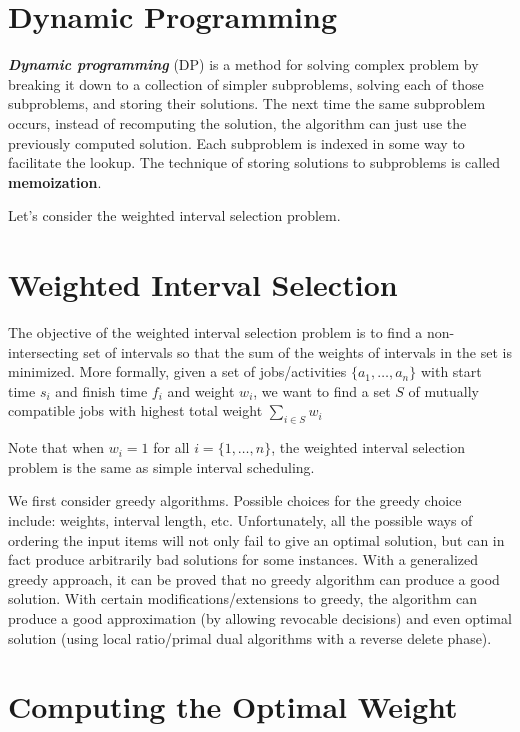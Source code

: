 \section{Dynamic Programming}  

\textit{\textbf{Dynamic programming}} (DP) is a method for solving complex problem by breaking it down to a collection of simpler subproblems, solving each of those subproblems, and storing their solutions. The next time the same subproblem occurs, instead of recomputing the solution, the algorithm can just use the previously computed solution. Each subproblem is indexed in some way to facilitate the lookup. The technique of storing solutions to subproblems is called \textbf{memoization}.

Let's consider the weighted interval selection problem.

\section{Weighted Interval Selection}

The objective of the weighted interval selection problem is to find a non-intersecting set of intervals so that the sum of the weights of intervals in the set is minimized. More formally, given a set of jobs/activities $\{a_1,\ldots,a_n\}$ with start time $s_i$ and finish time $f_i$ and weight $w_i$, we want to find a set $S$ of mutually compatible jobs with highest total weight $\sum_{i \in S} w_i$ 

Note that when $w_i = 1$ for all $i = \{1,\ldots,n\}$, the weighted interval selection problem is the same as simple interval scheduling.

We first consider greedy algorithms. Possible choices for the greedy choice include: weights, interval length, etc. Unfortunately, all the possible ways of ordering the input items will not only fail to give an optimal solution, but can in fact produce arbitrarily bad solutions for some instances. With a generalized greedy approach, it can be proved that no greedy algorithm can produce a good solution. With certain modifications/extensions to greedy, the algorithm can produce a good approximation (by allowing revocable decisions) and even optimal solution (using local ratio/primal dual algorithms with a reverse delete phase).

\section{Computing the Optimal Weight}
